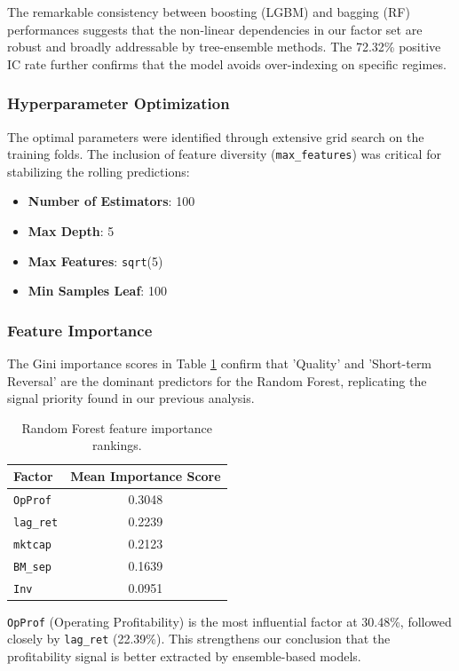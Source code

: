 \documentclass[11pt]{article}
\begin{document}
The remarkable consistency between boosting (LGBM) and bagging (RF) performances suggests that the non-linear dependencies in our factor set are robust and broadly addressable by tree-ensemble methods. The 72.32\% positive IC rate further confirms that the model avoids over-indexing on specific regimes.

\subsubsection{Hyperparameter Optimization}
The optimal parameters were identified through extensive grid search on the training folds. The inclusion of feature diversity (\texttt{max\_features}) was critical for stabilizing the rolling predictions:
\begin{itemize}
    \item \textbf{Number of Estimators}: 100
    \item \textbf{Max Depth}: 5
    \item \textbf{Max Features}: \texttt{sqrt}(5)
    \item \textbf{Min Samples Leaf}: 100
\end{itemize}

\subsubsection{Feature Importance}
The Gini importance scores in Table \ref{tab:rf_importance} confirm that 'Quality' and 'Short-term Reversal' are the dominant predictors for the Random Forest, replicating the signal priority found in our previous analysis.

\begin{table}[H]
\centering
\begin{tabular}{lc}
\toprule
\textbf{Factor} & \textbf{Mean Importance Score} \\
\midrule
\texttt{OpProf}   & 0.3048 \\
\texttt{lag\_ret} & 0.2239 \\
\texttt{mktcap}   & 0.2123 \\
\texttt{BM\_sep}  & 0.1639 \\
\texttt{Inv}      & 0.0951 \\
\bottomrule
\end{tabular}
\caption{Random Forest feature importance rankings.}
\label{tab:rf_importance}
\end{table}

\texttt{OpProf} (Operating Profitability) is the most influential factor at 30.48\%, followed closely by \texttt{lag\_ret} (22.39\%). This strengthens our conclusion that the profitability signal is better extracted by ensemble-based models.
\end{document}
